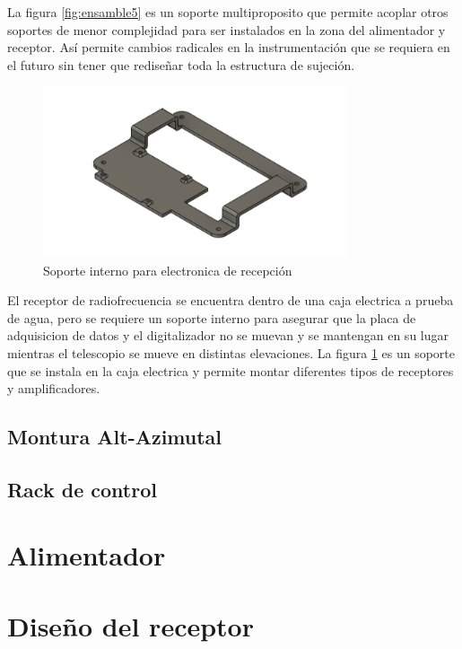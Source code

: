 La figura \ref{fig:ensamble5} es un soporte multiproposito que permite acoplar otros soportes de menor complejidad para ser instalados en la zona del alimentador y receptor. Así permite cambios radicales en la instrumentación que se requiera en el futuro sin tener que rediseñar toda la estructura de sujeción.\\

\begin{figure}
    \centering
    \includegraphics[width=0.8\textwidth]{img/soporte3D7}
    \caption{Soporte interno para electronica de recepción}
    \label{fig:ensamble6}
\end{figure}

El receptor de radiofrecuencia se encuentra dentro de una caja electrica a prueba de agua, pero se requiere un soporte interno para asegurar que la placa de adquisicion de datos y el digitalizador no se muevan y se mantengan en su lugar mientras el telescopio se mueve en distintas elevaciones. La figura \ref{fig:ensamble6} es un soporte que se instala en la caja electrica y permite montar diferentes tipos de receptores y amplificadores.\\


\subsection{Montura Alt-Azimutal}

\subsection{Rack de control}

\section{Alimentador}

\section{Diseño del receptor}

